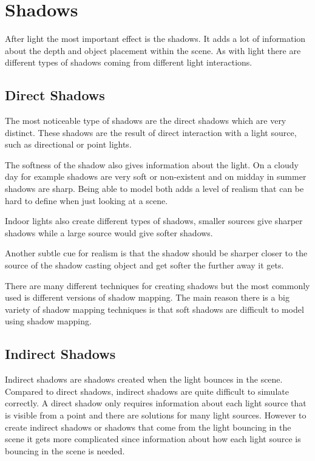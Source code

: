 \section{Shadows}

After light the most important effect is the shadows. It adds a lot of information about the depth and object placement within the scene. As with light there are different types of shadows coming from different light interactions. 

\subsection{Direct Shadows}

The most noticeable type of shadows are the direct shadows which are very distinct. These shadows are the result of direct interaction with a light source, such as directional or point lights. 

The softness of the shadow also gives information about the light. On a cloudy day for example shadows are very soft or non-existent and on midday in summer shadows are sharp. Being able to model both adds a level of realism that can be hard to define when just looking at a scene.

Indoor lights also create different types of shadows, smaller sources give sharper shadows while a large source would give softer shadows. 

Another subtle cue for realism is that the shadow should be sharper closer to the source of the shadow casting object and get softer the further away it gets. 

There are many different techniques for creating shadows but the most commonly used is different versions of shadow mapping. The main reason there is a big variety of shadow mapping techniques is that soft shadows are difficult to model using shadow mapping.

\subsection{Indirect Shadows}

Indirect shadows are shadows created when the light bounces in the scene. Compared to direct shadows, indirect shadows are quite difficult to simulate correctly. A direct shadow only requires information about each light source that is visible from a point and there are solutions for many light sources. However to create indirect shadows or shadows that come from the light bouncing in the scene it gets more complicated since information about how each light source is bouncing in the scene is needed. 

